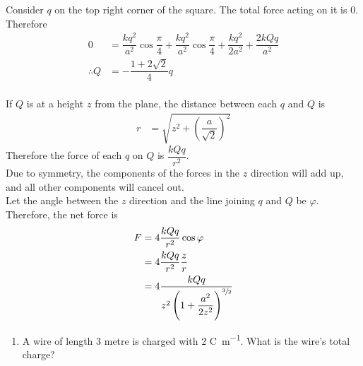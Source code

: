 \documentclass[fleqn, a4paper, 12pt, twoside]{article}
\theoremstyle{definition}
\theoremstyle{theorem}
\begin{document}
\begin{solution}[print]
	\begin{figure}[H]
	\end{figure}
	Consider $q$ on the top right corner of the square. The total force acting on it is 0. Therefore
	\begin{align*}
		0 &= \dfrac{k q^2}{a^2} \cos \dfrac{\pi}{4} + \dfrac{k q^2}{a^2} \cos \dfrac{\pi}{4} + \dfrac{k q^2}{2 a^2} + \dfrac{2 k Q q}{a^2}\\
		\therefore Q &= - \dfrac{1 + 2 \sqrt{2}}{4} q
	\end{align*}
	~\\
	If $Q$ is at a height $z$ from the plane, the distance between each $q$ and $Q$ is
	\begin{align*}
		r &= \sqrt{z^2 + \left( \dfrac{a}{\sqrt{2}} \right)^2}
	\end{align*}
	Therefore the force of each $q$ on $Q$ is $\dfrac{k Q q}{r^2}$.\\
	Due to symmetry, the components of the forces in the $z$ direction will add up, and all other components will cancel out.\\
	Let the angle between the $z$ direction and the line joining $q$ and $Q$ be $\varphi$.\\
	Therefore, the net force is 
	\begin{align*}
		F &= 4 \dfrac{k Q q}{r^2} \cos \varphi\\
		&= 4 \dfrac{k Q q}{r^2} \dfrac{z}{r}\\
		&= 4 \dfrac{k Q q}{z^2 \left( 1 + \dfrac{a^2}{2 z^2} \right)^{\sfrac{3}{2}}}
	\end{align*}
\end{solution}

\begin{question}
	\begin{enumerate}
		\item A wire of length 3 \si{metre} is charged with 2 \si{\coulomb\per\metre}. What is the wire's total charge?
	\end{enumerate}
\end{question}
\end{document}
